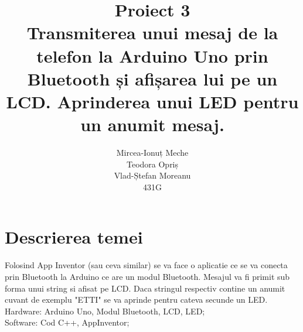 \documentclass[12pt, a4paper]{report}
\title{
    \huge\textbf{Proiect 3}\\
    \large Transmiterea unui mesaj de la telefon la Arduino Uno
    prin Bluetooth și afișarea lui pe un LCD. Aprinderea unui LED pentru
    un anumit mesaj.
}
\author{
    Mircea-Ionuț Meche\\
    Teodora Opriș\\
    Vlad-Ștefan Moreanu\\
    431G
}
\date{}
\begin{document}
\maketitle
\newpage

\tableofcontents

\chapter{Descrierea temei}

Folosind App Inventor (sau ceva similar) se va face o aplicatie ce se va
conecta prin Bluetooth la Arduino ce are un modul Bluetooth. Mesajul va fi
primit sub forma unui string si afisat pe LCD. Daca stringul respectiv contine
un anumit cuvant de exemplu "ETTI" se va aprinde pentru cateva secunde un LED.\\

Hardware: Arduino Uno, Modul Bluetooth, LCD, LED;\\

Software: Cod C++, AppInventor;\\
\end{document}
